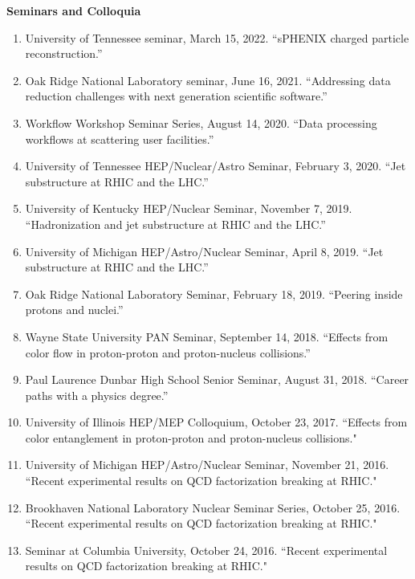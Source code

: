 \documentclass[11pt]{article}
\begin{document}
\vspace{7pt}
\begin{flushleft}
	\LARGE\textbf{Seminars and Colloquia} \\
	\normalsize
	\begin{enumerate}
		\item University of Tennessee seminar, March 15, 2022. ``sPHENIX charged particle reconstruction.''
		\item Oak Ridge National Laboratory seminar, June 16, 2021. ``Addressing data reduction challenges with next generation scientific software.''
		\item Workflow Workshop Seminar Series, August 14, 2020. ``Data processing workflows at scattering user facilities.''
		\item University of Tennessee HEP/Nuclear/Astro Seminar, February 3, 2020. ``Jet substructure at RHIC and the LHC.''
		\item University of Kentucky HEP/Nuclear Seminar, November 7, 2019. ``Hadronization and jet substructure at RHIC and the LHC.''
		\item University of Michigan HEP/Astro/Nuclear Seminar, April 8, 2019. ``Jet substructure at RHIC and the LHC.''
		\item Oak Ridge National Laboratory Seminar, February 18, 2019. ``Peering inside protons and nuclei.''
		\item Wayne State University PAN Seminar, September 14, 2018. ``Effects from color flow in proton-proton and proton-nucleus collisions.''
		\item Paul Laurence Dunbar High School Senior Seminar, August 31, 2018. ``Career paths with a physics degree.''
		\item University of Illinois HEP/MEP Colloquium, October 23, 2017. ``Effects from color entanglement in proton-proton and proton-nucleus collisions."
		\item University of Michigan HEP/Astro/Nuclear Seminar, November 21, 2016. ``Recent experimental results on QCD factorization breaking at RHIC."
		\item Brookhaven National Laboratory Nuclear Seminar Series, October 25, 2016. ``Recent experimental results on QCD factorization breaking at RHIC."
		\item Seminar at Columbia University, October 24, 2016. ``Recent experimental results on QCD factorization breaking at RHIC."
		
	\end{enumerate}
\end{flushleft}
\end{document}
